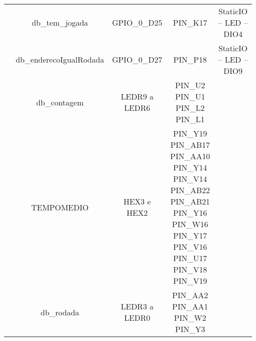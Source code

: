 \documentclass[amsmath,amssymb,floatfix]{report}
\begin{document}
\begin{table}[H]
\begin{tabular}{c|c|c|c|c|}
\multicolumn{1}{|c|}{}                           & db\_tem\_jogada         & GPIO\_0\_D25         & PIN\_K17                                                                                                                                                                              & StaticIO – LED – DIO4          \\ \cline{2-5} 
\multicolumn{1}{|c|}{}                           & db\_enderecoIgualRodada & GPIO\_0\_D27         & PIN\_P18                                                                                                                                                                              & StaticIO – LED – DIO9          \\ \cline{2-5} 
\multicolumn{1}{|c|}{}                           & db\_contagem            & LEDR9 a LEDR6        & \thead{PIN\_U2\\ PIN\_U1\\ PIN\_L2\\ PIN\_L1}                                                                                                                                         & \multicolumn{1}{l|}{}          \\ \cline{2-5} 
\multicolumn{1}{|c|}{}                           & TEMPOMEDIO             & HEX3 e HEX2          & \thead{PIN\_Y19 \\ PIN\_AB17 \\ PIN\_AA10 \\  PIN\_Y14 \\ PIN\_V14 \\  PIN\_AB22 \\  PIN\_AB21 \\PIN\_Y16 \\ PIN\_W16 \\ PIN\_Y17 \\ PIN\_V16 \\ PIN\_U17 \\ PIN\_V18 \\ PIN\_V19 \\} & \multicolumn{1}{l|}{}          \\ \cline{2-5} 
\multicolumn{1}{|c|}{}                           & db\_rodada       & LEDR3 a LEDR0        & \thead{PIN\_AA2\\ PIN\_AA1\\ PIN\_W2\\ PIN\_Y3}                                                                                                                   & \multicolumn{1}{l|}{}          \\ \cline{2-5} 

\end{tabular}
\end{table}
\end{document}
